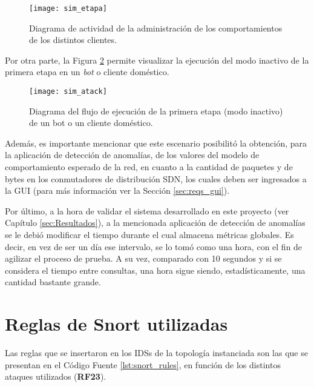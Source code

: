 \begin{figure}[H]
	\centering 
	\texttt{[image: sim\_etapa]}
	\caption{Diagrama de actividad de la administración de los comportamientos de
    los distintos clientes.}
	\label{fig:diagrama_escenario_legitimo_1}
\end{figure}

Por otra parte, la Figura \ref{fig:diagrama_escenario_legitimo_2} permite
visualizar la ejecución del modo inactivo de la primera etapa en un \textit{bot}
o cliente doméstico. \\

\begin{figure}[H]
	\centering 
	\texttt{[image: sim\_atack]}
	\caption{Diagrama del flujo de ejecución de la primera etapa (modo inactivo)
    de un bot o un cliente doméstico.}
	\label{fig:diagrama_escenario_legitimo_2}
\end{figure}


Además, es importante mencionar que este escenario posibilitó la obtención, para
la aplicación de detección de anomalías, de los valores del modelo de
comportamiento esperado de la red, en cuanto a la cantidad de paquetes y de
bytes en los conmutadores de distribución SDN, los cuales deben ser ingresados a
la GUI (para más información ver la Sección \ref{sec:reqs_gui}).

Por último, a la hora de validar el sistema desarrollado en este proyecto (ver Capítulo \ref{sec:Resultados}),
a la mencionada aplicación de detección de anomalías se le debió modificar el tiempo durante el cual almacena métricas globales. Es decir, en vez de ser un día ese intervalo, se lo tomó como una hora, con el fin de agilizar el proceso de prueba. A su vez, comparado con 10 segundos y si se considera el tiempo entre consultas, una hora sigue siendo, estadísticamente, una cantidad bastante grande.

\section {Reglas de Snort utilizadas}\label{sec:snort_reglas}

Las reglas que se insertaron en los IDSs de la topología instanciada son las que
se presentan en el Código Fuente \ref{lst:snort_rules}, en función de los
distintos ataques utilizados (\textbf{RF23}).


